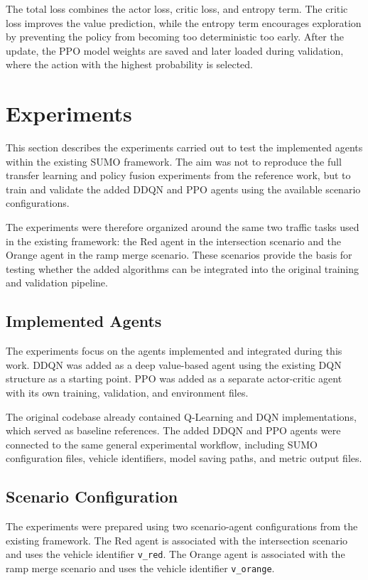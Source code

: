 \documentclass{article}
\begin{document}
The total loss combines the actor loss, critic loss, and entropy term. The critic loss improves the value prediction, while the entropy term encourages exploration by preventing the policy from becoming too deterministic too early. After the update, the PPO model weights are saved and later loaded during validation, where the action with the highest probability is selected.

\section{Experiments}

This section describes the experiments carried out to test the implemented agents within the existing SUMO framework. The aim was not to reproduce the full transfer learning and policy fusion experiments from the reference work, but to train and validate the added DDQN and PPO agents using the available scenario configurations.

The experiments were therefore organized around the same two traffic tasks used in the existing framework: the Red agent in the intersection scenario and the Orange agent in the ramp merge scenario. These scenarios provide the basis for testing whether the added algorithms can be integrated into the original training and validation pipeline.


\subsection{Implemented Agents}

The experiments focus on the agents implemented and integrated during this work. DDQN was added as a deep value-based agent using the existing DQN structure as a starting point. PPO was added as a separate actor-critic agent with its own training, validation, and environment files.

The original codebase already contained Q-Learning and DQN implementations, which served as baseline references. The added DDQN and PPO agents were connected to the same general experimental workflow, including SUMO configuration files, vehicle identifiers, model saving paths, and metric output files.

\subsection{Scenario Configuration}

The experiments were prepared using two scenario-agent configurations from the existing framework. The Red agent is associated with the intersection scenario and uses the vehicle identifier \texttt{v\_red}. The Orange agent is associated with the ramp merge scenario and uses the vehicle identifier \texttt{v\_orange}.
\end{document}
